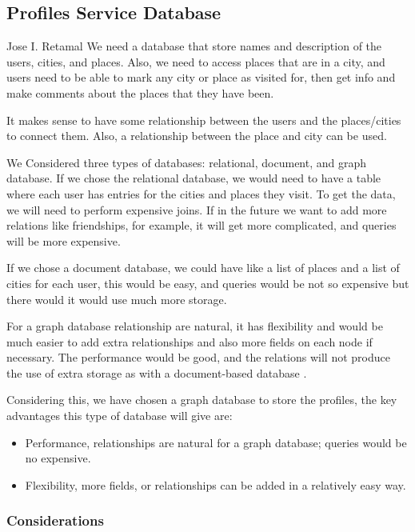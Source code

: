\subsection{Profiles Service Database}
Jose I. Retamal
\vskip 0.1in
\indent
\indent
We need a database that store names and description of the users, cities, and places. Also, we need to access places that are in a city, and users need to be able to mark any city or place as visited for, then get info and make comments about the places that they have been. 

It makes sense to have some relationship between the users and the places/cities to connect them. Also, a relationship between the place and city can be used. 

We Considered three types of databases: relational, document, and graph database. 
If we chose the relational database, we would need to have a table where each user has entries for the cities and places they visit. To get the data, we will need to perform expensive joins. If in the future we want to add more relations like friendships, for example, it will get more complicated, and queries will be more expensive. 

If we chose a document database, we could have like a list of places and a list of cities for each user, this would be easy, and queries would be not so expensive but there would it would use much more storage. 

For a graph database relationship are natural, it has flexibility and would be much easier to add extra relationships and also more fields on each node if necessary. The performance would be good, and the relations will not produce the use of extra storage as with a document-based database \cite{gdbad}.

Considering this, we have chosen a graph database to store the profiles, the key advantages this type of database will give are:

\begin{itemize}
	\item Performance, relationships are natural for a graph database; queries would be no expensive.
	\item Flexibility, more fields, or relationships can be added in a relatively easy way.
\end{itemize}

\subsubsection{Considerations}

